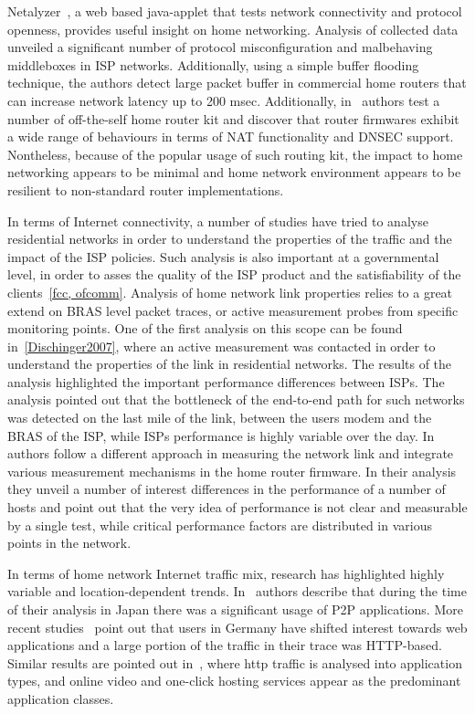 Netalyzer~\cite{Kreibich10}, a web based java-applet that tests network
connectivity and protocol openness, provides useful insight on home networking.
Analysis of collected data unveiled a significant number of protocol
misconfiguration and malbehaving middleboxes in ISP networks. Additionally,
using a simple buffer flooding technique, the authors detect large packet buffer
in commercial home routers that can increase network latency up to 200 msec.
Additionally, in~\cite{Hatonen10} authors test a number of off-the-self home
router kit and discover that router firmwares exhibit a wide range of behaviours
in terms of NAT functionality and DNSEC support. Nontheless, because of the
popular usage of such routing kit, the impact to home networking appears to be
minimal and home network environment appears to be resilient to non-standard
router implementations. 

In terms of Internet connectivity, a number of studies have tried to analyse
residential networks in order to understand the properties of the traffic and
the impact of the ISP policies. Such analysis is also important at a
governmental level, in order to asses the quality of the ISP product and the
satisfiability of the clients~\ref{fcc, ofcomm}. Analysis of home network link
properties relies to a great extend  on BRAS level packet traces, or active
measurement probes from specific monitoring points. One of the first analysis on
this scope can be found in~\ref{Dischinger2007}, where an active measurement was
contacted in order to understand the properties of the link in residential
networks. The results of the analysis highlighted the important performance
differences between ISPs. The analysis pointed out that the bottleneck of the
end-to-end path for such networks was detected on the last mile of the link,
between the users modem and the BRAS of the ISP, while ISPs performance is
highly variable over the day. In~\cite{Sundaresan2011} authors follow a
different approach in measuring the network link and integrate various
measurement mechanisms in the home router firmware. In their analysis they
unveil a number of interest differences in the performance of a number of hosts
and point out that the very idea of performance is not clear and measurable by a
single test, while critical performance factors are distributed in various
points in the network.  

In terms of home network Internet traffic mix, research has highlighted highly
variable and location-dependent trends. In~\cite{Cho2006} authors describe that
during the time of their analysis in Japan there was a significant usage of P2P
applications. More recent studies~\cite{Maier2009} point out that users in
Germany have shifted interest towards web applications and a large portion of
the traffic in their trace was HTTP-based. Similar results are pointed out
in~\cite{Erman2011}, where http traffic is analysed into application types, and
online video and one-click hosting services appear as the predominant
application classes. 

